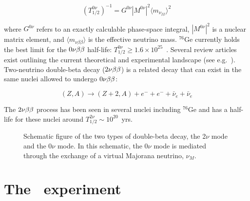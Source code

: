 		\begin{equation}
		\left( T_{1/2}^{0\nu}\right)^{-1} = G^{0\nu} |M^{0\nu}|^2 \langle m_{\nu_{\beta\beta}} \rangle^2  
		\end{equation} 

where $G^{0\nu}$ refers to an exactly calculable phase-space integral, 
$|M^{0\nu}|^2$ is a nuclear matrix element, and $\langle m_{\nu{\beta\beta}}\rangle$
is the effective neutrino mass.  $^{76}$Ge currently holds the best limit for
the $\nonubb$ half-life: $T^{0\nu}_{1/2}\geq 1.6\times10^{25}$~\cite{Bau99}.
Several review articles exist outlining the current theoretical and
experimental landscape (see e.g.~\cite{Ell02,Bara07}).  
Two-neutrino double-beta decay ($\twonubb$) is a related 
decay that can exist in the same nuclei allowed to undergo $\nonubb$:  

		\begin{equation}
		(Z,A) \rightarrow (Z+2,A) + e^- + e^- + \bar{\nu}_e + \bar{\nu}_e
		\end{equation}

The $\twonubb$ process has been seen in several nuclei including $^{76}$Ge and has
a half-life for these nuclei around $T^{2\nu}_{1/2}\sim10^{20}$~yrs.  

		\begin{figure}
			\centering
			\def\figheight{0.38\textheight}
		\caption[Schematic of $\twonubb$ and $\nonubb$ decays.]{Schematic figure of the two types of double-beta decay, 
		the 2$\nu$ mode and the 0$\nu$ mode.  
			In this schematic, the 0$\nu$ mode is mediated through the exchange of a virtual Majorana neutrino, $\nu_{M}$.}
		\label{fig:DBDK}
		\end{figure}
 

	
	\section{The \MJ\ experiment}
	\label{sec:MJExperiment}
	
